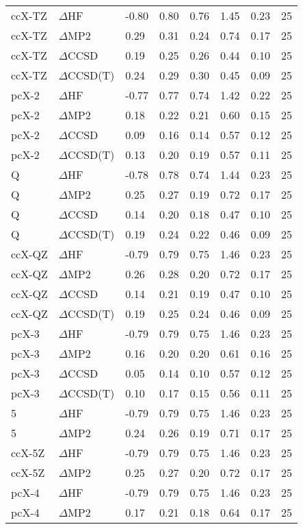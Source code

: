 \begin{table}
\begin{tabular}{l l l l l l l l }
    ccX-TZ & $\Delta$HF & -0.80 & 0.80 & 0.76 & 1.45 & 0.23 & 25 \\ 
    ccX-TZ & $\Delta$MP2 & 0.29 & 0.31 & 0.24 & 0.74 & 0.17 & 25 \\ 
    ccX-TZ & $\Delta$CCSD & 0.19 & 0.25 & 0.26 & 0.44 & 0.10 & 25 \\ 
    ccX-TZ & $\Delta$CCSD(T) & 0.24 & 0.29 & 0.30 & 0.45 & 0.09 & 25 \\ 
    pcX-2 & $\Delta$HF & -0.77 & 0.77 & 0.74 & 1.42 & 0.22 & 25 \\ 
    pcX-2 & $\Delta$MP2 & 0.18 & 0.22 & 0.21 & 0.60 & 0.15 & 25 \\ 
    pcX-2 & $\Delta$CCSD & 0.09 & 0.16 & 0.14 & 0.57 & 0.12 & 25 \\ 
    pcX-2 & $\Delta$CCSD(T) & 0.13 & 0.20 & 0.19 & 0.57 & 0.11 & 25 \\ 
    Q & $\Delta$HF & -0.78 & 0.78 & 0.74 & 1.44 & 0.23 & 25 \\ 
    Q & $\Delta$MP2 & 0.25 & 0.27 & 0.19 & 0.72 & 0.17 & 25 \\ 
    Q & $\Delta$CCSD & 0.14 & 0.20 & 0.18 & 0.47 & 0.10 & 25 \\ 
    Q & $\Delta$CCSD(T) & 0.19 & 0.24 & 0.22 & 0.46 & 0.09 & 25 \\ 
    ccX-QZ & $\Delta$HF & -0.79 & 0.79 & 0.75 & 1.46 & 0.23 & 25 \\ 
    ccX-QZ & $\Delta$MP2 & 0.26 & 0.28 & 0.20 & 0.72 & 0.17 & 25 \\ 
    ccX-QZ & $\Delta$CCSD & 0.14 & 0.21 & 0.19 & 0.47 & 0.10 & 25 \\ 
    ccX-QZ & $\Delta$CCSD(T) & 0.19 & 0.25 & 0.24 & 0.46 & 0.09 & 25 \\ 
    pcX-3 & $\Delta$HF & -0.79 & 0.79 & 0.75 & 1.46 & 0.23 & 25 \\ 
    pcX-3 & $\Delta$MP2 & 0.16 & 0.20 & 0.20 & 0.61 & 0.16 & 25 \\ 
    pcX-3 & $\Delta$CCSD & 0.05 & 0.14 & 0.10 & 0.57 & 0.12 & 25 \\ 
    pcX-3 & $\Delta$CCSD(T) & 0.10 & 0.17 & 0.15 & 0.56 & 0.11 & 25 \\ 
    5 & $\Delta$HF & -0.79 & 0.79 & 0.75 & 1.46 & 0.23 & 25 \\ 
    5 & $\Delta$MP2 & 0.24 & 0.26 & 0.19 & 0.71 & 0.17 & 25 \\ 
    ccX-5Z & $\Delta$HF & -0.79 & 0.79 & 0.75 & 1.46 & 0.23 & 25 \\ 
    ccX-5Z & $\Delta$MP2 & 0.25 & 0.27 & 0.20 & 0.72 & 0.17 & 25 \\ 
    pcX-4 & $\Delta$HF & -0.79 & 0.79 & 0.75 & 1.46 & 0.23 & 25 \\ 
    pcX-4 & $\Delta$MP2 & 0.17 & 0.21 & 0.18 & 0.64 & 0.17 & 25 \\ 
    \bottomrule
  \end{tabular}
\end{table}
